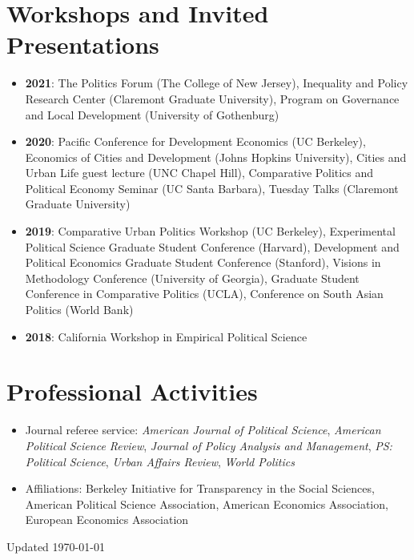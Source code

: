 \documentclass[11pt]{article}
\begin{document}
\section*{Workshops and Invited Presentations}
\color{Black}
\begin{itemize}
\item[] \textbf{2021}: The Politics Forum (The College of New Jersey), Inequality and Policy Research Center (Claremont Graduate University), Program on Governance and Local Development (University of Gothenburg)
\item[] \textbf{2020}: Pacific Conference for Development Economics (UC Berkeley), Economics of Cities and Development (Johns Hopkins University), Cities and Urban Life guest lecture (UNC Chapel Hill), Comparative Politics and Political Economy Seminar (UC Santa Barbara), Tuesday Talks (Claremont Graduate University)
\item[] \textbf{2019}: Comparative Urban Politics Workshop (UC Berkeley), Experimental Political Science Graduate Student Conference (Harvard), Development and Political Economics Graduate Student Conference (Stanford), Visions in Methodology Conference (University of Georgia), Graduate Student Conference in Comparative Politics (UCLA), Conference on South Asian Politics (World Bank)
\item[] \textbf{2018}: California Workshop in Empirical Political Science
\end{itemize}

\vspace{2mm}

\color{MidnightBlue}

\section*{Professional Activities}
\color{Black}

\begin{itemize}	

\item[]Journal referee service: \textit{American Journal of Political Science}, \textit{American Political Science Review}, \textit{Journal of Policy Analysis and Management}, \textit{PS: Political Science}, \textit{Urban Affairs Review}, \textit{World Politics}\item[]Affiliations: Berkeley Initiative for Transparency in the Social Sciences, American Political Science Association,  American Economics Association, European Economics Association
\end{itemize}


\vspace*{\fill}

\flushright Updated \today
\end{document}

